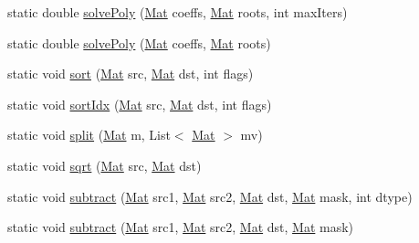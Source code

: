 \begin{DoxyCompactItemize}
\item 
static double \mbox{\hyperlink{classorg_1_1opencv_1_1core_1_1_core_afff6c36fd7aad820639aa8de5b52a5f7}{solve\+Poly}} (\mbox{\hyperlink{classorg_1_1opencv_1_1core_1_1_mat}{Mat}} coeffs, \mbox{\hyperlink{classorg_1_1opencv_1_1core_1_1_mat}{Mat}} roots, int max\+Iters)
\item 
static double \mbox{\hyperlink{classorg_1_1opencv_1_1core_1_1_core_aec537b8ec1bca2bbff556a00efc08579}{solve\+Poly}} (\mbox{\hyperlink{classorg_1_1opencv_1_1core_1_1_mat}{Mat}} coeffs, \mbox{\hyperlink{classorg_1_1opencv_1_1core_1_1_mat}{Mat}} roots)
\item 
static void \mbox{\hyperlink{classorg_1_1opencv_1_1core_1_1_core_ae5b5fdaa4bafa45a5a43443016b037b6}{sort}} (\mbox{\hyperlink{classorg_1_1opencv_1_1core_1_1_mat}{Mat}} src, \mbox{\hyperlink{classorg_1_1opencv_1_1core_1_1_mat}{Mat}} dst, int flags)
\item 
static void \mbox{\hyperlink{classorg_1_1opencv_1_1core_1_1_core_a68ae6cb0aec9fde08e91a48427684a7e}{sort\+Idx}} (\mbox{\hyperlink{classorg_1_1opencv_1_1core_1_1_mat}{Mat}} src, \mbox{\hyperlink{classorg_1_1opencv_1_1core_1_1_mat}{Mat}} dst, int flags)
\item 
static void \mbox{\hyperlink{classorg_1_1opencv_1_1core_1_1_core_aa22f046c4f14cda50c10f5d22ffdbb26}{split}} (\mbox{\hyperlink{classorg_1_1opencv_1_1core_1_1_mat}{Mat}} m, List$<$ \mbox{\hyperlink{classorg_1_1opencv_1_1core_1_1_mat}{Mat}} $>$ mv)
\item 
static void \mbox{\hyperlink{classorg_1_1opencv_1_1core_1_1_core_a5a2235761d8876294b3277876479107b}{sqrt}} (\mbox{\hyperlink{classorg_1_1opencv_1_1core_1_1_mat}{Mat}} src, \mbox{\hyperlink{classorg_1_1opencv_1_1core_1_1_mat}{Mat}} dst)
\item 
static void \mbox{\hyperlink{classorg_1_1opencv_1_1core_1_1_core_a8020349ec5e9b654d78d690654c79606}{subtract}} (\mbox{\hyperlink{classorg_1_1opencv_1_1core_1_1_mat}{Mat}} src1, \mbox{\hyperlink{classorg_1_1opencv_1_1core_1_1_mat}{Mat}} src2, \mbox{\hyperlink{classorg_1_1opencv_1_1core_1_1_mat}{Mat}} dst, \mbox{\hyperlink{classorg_1_1opencv_1_1core_1_1_mat}{Mat}} mask, int dtype)
\item 
static void \mbox{\hyperlink{classorg_1_1opencv_1_1core_1_1_core_aba1cd3f5a5c28b9c72daf97b95677d7a}{subtract}} (\mbox{\hyperlink{classorg_1_1opencv_1_1core_1_1_mat}{Mat}} src1, \mbox{\hyperlink{classorg_1_1opencv_1_1core_1_1_mat}{Mat}} src2, \mbox{\hyperlink{classorg_1_1opencv_1_1core_1_1_mat}{Mat}} dst, \mbox{\hyperlink{classorg_1_1opencv_1_1core_1_1_mat}{Mat}} mask)

\end{DoxyCompactItemize}
